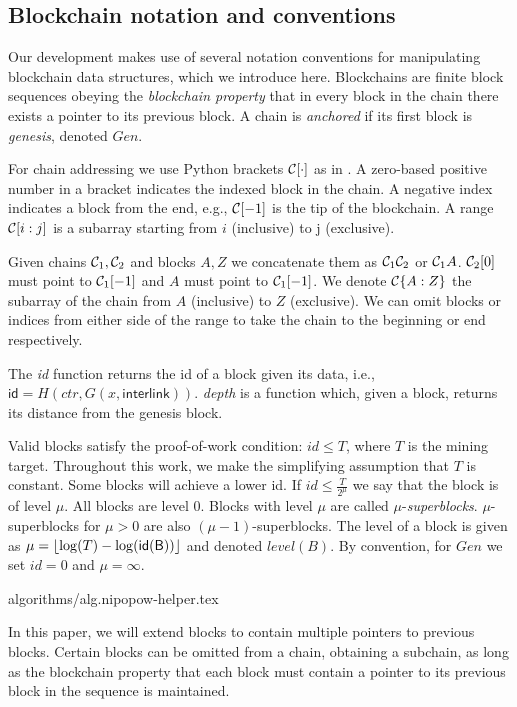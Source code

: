 \subsection{Blockchain notation and conventions}
Our development makes use of several notation conventions for manipulating blockchain data structures, which we introduce here.
Blockchains are finite block sequences obeying the \textit{blockchain property}
that in every block in the chain there exists a pointer to its previous block.
A chain is \textit{anchored} if its first block is \textit{genesis}, denoted
$Gen$.

For chain addressing we use Python brackets $\mathcal{C}[\cdot]$ as in
\cite{fruitchains}. A zero-based positive number in a bracket indicates the
indexed block in the chain. A negative index indicates a block from the end,
e.g., $\mathcal{C}[-1]$ is the tip of the blockchain. A range $\mathcal{C}[i:j]$ is a
subarray starting from $i$ (inclusive) to j (exclusive).

Given chains $\mathcal{C}_1, \mathcal{C}_2$ and blocks $A, Z$ we concatenate them as
$\mathcal{C}_1 \mathcal{C}_2$ or $\mathcal{C}_1 A$. $\mathcal{C}_2[0]$ must point to $\mathcal{C}_1[-1]$
and $A$ must point to $\mathcal{C}_1[-1]$. We denote $\mathcal{C}\{A:Z\}$ the subarray of
the chain from $A$ (inclusive) to $Z$ (exclusive). We can omit blocks or indices
from either side of the range to take the chain to the beginning or end
respectively.

The \textit{id} function returns the
id of a block given its data, i.e., $\textsf{id} = H(ctr, G(x,
\textsf{interlink}))$. %
 \textit{depth} is a function which, given a block, returns
its distance from the genesis block.

Valid blocks satisfy the proof-of-work condition: $id \leq T$, where $T$ is the
mining target. Throughout this work, we make the simplifying assumption that $T$
is constant. Some blocks will achieve a lower id. If $id \leq \frac{T}{2^\mu}$
we say that the block is of level $\mu$. All blocks are level $0$. Blocks with
level $\mu$ are called $\mu$-\textit{superblocks}.
$\mu$-superblocks for $\mu > 0$ are also $(\mu - 1)$-superblocks.
The level of a block is given as
$\mu = \left \lfloor \log(T) - \log(\sf{id}(B)) \right \rfloor$ and denoted
$\textit{level}(B)$.
By convention, for $Gen$ we set $id = 0$ and $\mu = \infty$.

{algorithms/alg.nipopow-helper.tex}

In this paper, we will extend blocks to contain multiple pointers to previous
blocks. Certain blocks can be omitted from a chain, obtaining a subchain, as
long as the blockchain property that each block must contain a pointer to its
previous block in the sequence is maintained.

